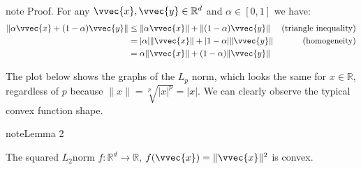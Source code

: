 \documentclass[letterpaper,10pt,english]{jupyterBook}
\begin{document}
\begin{sphinxadmonition}{note}
\sphinxAtStartPar
Proof. For any \(\vvec{x},\vvec{y}\in\mathbb{R}^d\) and \(\alpha\in[0,1]\) we have:
\begin{align*}
    \lVert\alpha\vvec{x} +(1-\alpha)\vvec{y} \rVert &\leq \lVert\alpha\vvec{x}\rVert +\lVert(1-\alpha)\vvec{y} \rVert &\text{(triangle inequality)}\\
    &= \lvert\alpha\rvert\lVert\vvec{x}\rVert +\lvert1-\alpha\rvert\lVert\vvec{y} \rVert &\text{(homogeneity)}\\
    &=\alpha\lVert\vvec{x}\rVert +(1-\alpha)\lVert\vvec{y} \rVert
\end{align*}\end{sphinxadmonition}

\sphinxAtStartPar
The plot below shows the graphs of the \(L_p\) norm, which looks the same for \(x\in\mathbb{R}\), regardless of \(p\) because \(\lVert x\rVert = \sqrt[p]{\lvert x\rvert^p} = \lvert x\rvert\). We can clearly observe the typical convex function shape.
\begin{center}\end{center}\label{optimization_convex:lemma-7}
\begin{sphinxadmonition}{note}{Lemma 2}



\sphinxAtStartPar
The squared \(L_2\)\sphinxhyphen{}norm \(f:\mathbb{R}^d\rightarrow \mathbb{R}\), \(f(\vvec{x})=\lVert\vvec{x}\rVert^2\) is convex.
\end{sphinxadmonition}
\end{document}
